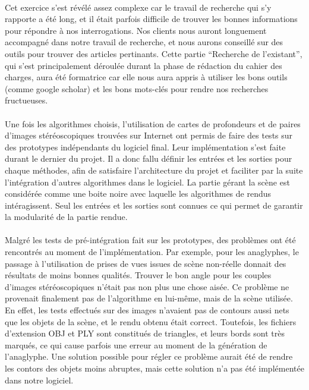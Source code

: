 \paragraph{}
Cet exercice s'est révélé assez complexe car le travail de recherche qui s'y rapporte a été long, et il était parfois difficile de trouver les bonnes informations pour répondre à nos interrogations. Nos clients nous auront longuement accompagné dans notre travail de recherche, et nous aurons conseillé sur des outils pour trouver des articles pertinants. Cette partie ``Recherche de l'existant'', qui s'est principalement déroulée durant la phase de rédaction du cahier des charges, aura été formatrice car elle nous aura appris à utiliser les bons outils (comme google scholar) et les bons mots-clés pour rendre nos recherches fructueuses.

\paragraph{}
Une fois les algorithmes choisis, l'utilisation de cartes de profondeurs et de paires d'images stéréoscopiques trouvées sur Internet ont permis de faire des tests sur des prototypes indépendants du logiciel final. Leur implémentation s'est faite durant le dernier du projet. Il a donc fallu définir les entrées et les sorties pour chaque méthodes, afin de satisfaire l'architecture du projet et faciliter par la suite l'intégration d'autres algorithmes dans le logiciel.
La partie gérant la scène est considérée comme une boite noire avec laquelle les algorithmes de rendus intéragissent. Seul les entrées et les sorties sont connues ce qui permet de garantir la modularité de la partie rendue. 

\paragraph{}
Malgré les tests de pré-intégration fait sur les prototypes, des problèmes ont été rencontrés au moment de l'implémentation. Par exemple, pour les anaglyphes, le passage à l'utilisation de prises de vues issues de scène non-réelle donnait des résultats de moins bonnes qualités. Trouver le bon angle pour les couples d'images stéréoscopiques n'était pas non plus une chose aisée.
Ce problème ne provenait finalement pas de l'algorithme en lui-même, mais de la scène utilisée. En effet, les tests effectués sur des images n'avaient pas de contours aussi nets que les objets de la scène, et le rendu obtenu était correct. Toutefois, les fichiers d'extension OBJ et PLY sont constitués de triangles, et leurs bords sont très marqués, ce qui cause parfois une erreur au moment de la génération de l'anaglyphe. Une solution possible pour régler ce problème aurait été de rendre les contors des objets moins abruptes, mais cette solution n'a pas été implémentée dans notre logiciel.

